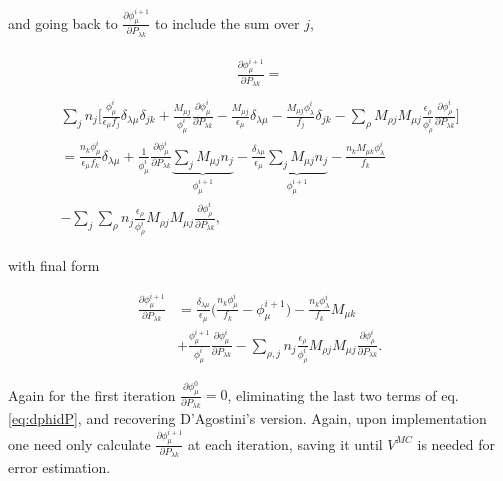 and going back to $\frac{\partial \phi^{i+1}_{\mu}}{\partial P_{\lambda k}}$ to include the sum over $j$,

\begin{align*}
\begin{split}
	\frac{\partial \phi^{i+1}_{\mu}}{\partial P_{\lambda k}} =
\end{split}
\end{align*}
%
\begin{align*}
\begin{split}
	\sum_{j} n_{j} \bigg[ \frac {\phi^{i}_{\mu} }{\epsilon_{\mu} f_{j}} \delta _{\lambda \mu} \delta_{jk}
	+ \frac{M_{\mu j}}{\phi^{i}_{\mu}} \frac{\partial \phi^{i}_{\mu}}{\partial P_{\lambda k}}
	- \frac{M_{\mu j}}{\epsilon_{\mu}} \delta_{\lambda \mu}
	- \frac{M_{\mu j} \phi^{i}_{\lambda}}{f_{j}} \delta_{jk}
	- \sum_{\rho} M_{\rho j}M_{\mu j} \frac{\epsilon_{\rho}}{\phi^{i}_{\rho}} \frac{\partial \phi^{i}_{\rho}}{\partial P_{\lambda k}} \bigg] 
	\\
	= \frac { n_{k} \phi^{i}_{\mu} }{\epsilon_{\mu} f_{k}} \delta _{\lambda \mu}
	+ \frac{1}{\phi^{i}_{\mu}} \frac{\partial \phi^{i}_{\mu}}{\partial P_{\lambda k}} \underbrace{\sum_{j}{ M_{\mu j} n_{j} }}_{\phi^{i+1}_{\mu}}
	- \frac{\delta_{\lambda \mu}}{\epsilon_{\mu}} \underbrace{\sum_{j}{ M_{\mu j} n_{j}}}_{\phi^{i+1}_{\mu}} 
	- \frac{n_{k} M_{\mu k} \phi^{i}_{\lambda}}{f_{k}}
	\\
	- \sum_{j}{ \sum_{\rho} n_{j} \frac{\epsilon_{\rho}}{\phi^{i}_{\rho}} M_{\rho j}M_{\mu j} \frac{\partial \phi^{i}_{\rho}}{\partial P_{\lambda k}} },
\end{split}
\end{align*}

with final form

\begin{equation} \label{eq:dphidP}
\begin{split}
	\frac{\partial \phi^{i+1}_{\mu}}{\partial P_{\lambda k}}
	&= \frac{\delta_{\lambda \mu}}{\epsilon_{\mu}} \bigg(\frac { n_{k} \phi^{i}_{\mu} }{ f_{k}} - \phi^{i+1}_{\mu} \bigg)
	- \frac{n_{k} \phi^{i}_{\lambda} }{f_{k}} M_{\mu k} \\
	&
	+ \frac{\phi^{i+1}_{\mu}}{\phi^{i}_{\mu}} \frac{\partial \phi^{i}_{\mu}}{\partial P_{\lambda k}} 
	- \sum_{\rho,j}{ n_{j} \frac{\epsilon_{\rho}}{\phi^{i}_{\rho}} M_{\rho j}M_{\mu j} \frac{\partial \phi^{i}_{\rho}}{\partial P_{\lambda k}} }.
\end{split}
\end{equation}

Again for the first iteration $\frac{\partial \phi^{0}_{\mu}}{\partial P_{\lambda k}} = 0$, eliminating the last two terms of eq. \ref{eq:dphidP}, and recovering
D'Agostini's version. Again, upon implementation one need only calculate $\frac{\partial \phi^{i+1}_{\mu}}{\partial P_{\lambda k}}$ at each iteration, 
saving it until $V^{MC}$ is needed for error estimation.

